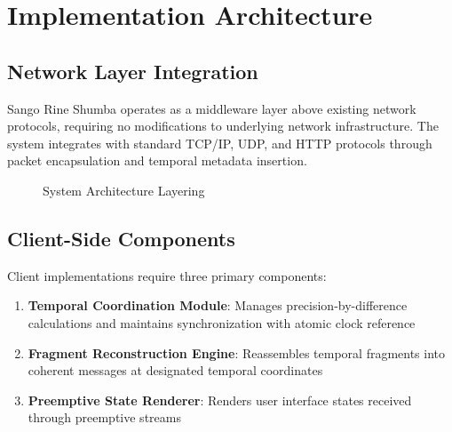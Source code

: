\documentclass[12pt,a4paper]{article}
\begin{document}
\section{Implementation Architecture}

\subsection{Network Layer Integration}

Sango Rine Shumba operates as a middleware layer above existing network protocols, requiring no modifications to underlying network infrastructure. The system integrates with standard TCP/IP, UDP, and HTTP protocols through packet encapsulation and temporal metadata insertion.

\begin{figure}[htbp]
\centering
{}
\caption{System Architecture Layering}
\end{figure}

\subsection{Client-Side Components}

Client implementations require three primary components:

\begin{enumerate}
\item \textbf{Temporal Coordination Module}: Manages precision-by-difference calculations and maintains synchronization with atomic clock reference
\item \textbf{Fragment Reconstruction Engine}: Reassembles temporal fragments into coherent messages at designated temporal coordinates
\item \textbf{Preemptive State Renderer}: Renders user interface states received through preemptive streams
\end{enumerate}
\end{document}
